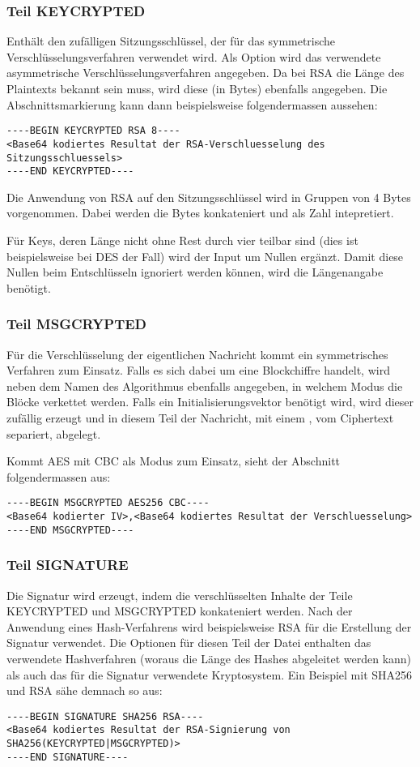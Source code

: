 \documentclass[11pt,a4paper,parskip=half]{scrartcl}
\begin{document}
\subsubsection{Teil KEYCRYPTED}
Enthält den zufälligen \glqq{}Sitzungsschlüssel\grqq{}, der für das symmetrische Verschlüsselungsverfahren verwendet wird. Als Option wird das verwendete asymmetrische Verschlüsselungsverfahren angegeben. Da bei RSA die Länge des Plaintexts bekannt sein muss, wird diese (in Bytes) ebenfalls angegeben. Die Abschnittsmarkierung kann dann beispielsweise folgendermassen aussehen:
\begin{lstlisting}
----BEGIN KEYCRYPTED RSA 8----
<Base64 kodiertes Resultat der RSA-Verschluesselung des Sitzungsschluessels>
----END KEYCRYPTED----
\end{lstlisting}

Die Anwendung von RSA auf den Sitzungsschlüssel wird in Gruppen von 4 Bytes vorgenommen. Dabei werden die Bytes konkateniert und als Zahl intepretiert.

Für Keys, deren Länge nicht ohne Rest durch vier teilbar sind (dies ist beispielsweise bei DES der Fall) wird der Input um Nullen ergänzt. Damit diese Nullen beim Entschlüsseln ignoriert werden können, wird die Längenangabe benötigt.

\subsubsection{Teil MSGCRYPTED}
Für die Verschlüsselung der eigentlichen Nachricht kommt ein symmetrisches Verfahren zum Einsatz. Falls es sich dabei um eine Blockchiffre handelt, wird neben dem Namen des Algorithmus ebenfalls angegeben, in welchem Modus die Blöcke verkettet werden. Falls ein Initialisierungsvektor benötigt wird, wird dieser zufällig erzeugt und in diesem Teil der Nachricht, mit einem \glqq{},\grqq{} vom Ciphertext separiert, abgelegt.

Kommt AES mit CBC als Modus zum Einsatz, sieht der Abschnitt folgendermassen aus:
\begin{lstlisting}
----BEGIN MSGCRYPTED AES256 CBC----
<Base64 kodierter IV>,<Base64 kodiertes Resultat der Verschluesselung>
----END MSGCRYPTED----
\end{lstlisting}

\subsubsection{Teil SIGNATURE}
Die Signatur wird erzeugt, indem die verschlüsselten Inhalte der Teile KEYCRYPTED und MSGCRYPTED konkateniert werden. Nach der Anwendung eines Hash-Verfahrens wird beispielsweise RSA für die Erstellung der Signatur verwendet. Die Optionen für diesen Teil der Datei enthalten das verwendete Hashverfahren (woraus die Länge des Hashes abgeleitet werden kann) als auch das für die Signatur verwendete Kryptosystem. Ein Beispiel mit SHA256 und RSA sähe demnach so aus:
\begin{lstlisting}
----BEGIN SIGNATURE SHA256 RSA----
<Base64 kodiertes Resultat der RSA-Signierung von SHA256(KEYCRYPTED|MSGCRYPTED)>
----END SIGNATURE----
\end{lstlisting}
\end{document}
